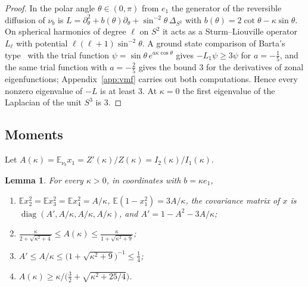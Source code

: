 \documentclass[aps,prd,twocolumn,superscriptaddress,nofootinbib,longbibliography,floatfix,amsmath,amssymb,10pt]{revtex4-2}
\newtheorem{lemma}[theorem]{Lemma}
\theoremstyle{definition}
\theoremstyle{remark}
\newcommand{\E}{\mathbb{E}}
\begin{document}
\begin{proof}
In the polar angle $\theta\in(0,\pi)$ from $e_1$ the generator of the
reversible diffusion of $\nu_b$ is $L=\partial_\theta^2+b(\theta)
\partial_\theta+\sin^{-2}\theta\,\Delta_{S^2}$ with $b(\theta)=2\cot\theta-
\kappa\sin\theta$. On spherical harmonics of degree $\ell$ on $S^2$ it acts as
a Sturm--Liouville operator $L_\ell$ with potential
$\ell(\ell+1)\sin^{-2}\theta$. A ground state comparison of Barta's
type~\cite{Bar37} with the trial function $\psi=\sin\theta\,
e^{a\kappa\cos\theta}$ gives $-L_1\psi\ge3\psi$ for $a=-\frac15$, and the same
trial function with $a=-\frac25$ gives the bound $3$ for the derivatives of
zonal eigenfunctions; Appendix~\ref{app:vmf} carries out both computations.
Hence every nonzero eigenvalue of $-L$ is at least $3$. At $\kappa=0$ the
first eigenvalue of the Laplacian of the unit $S^3$ is $3$.
\end{proof}

\subsection{Moments}

Let $A(\kappa)=\E_{\nu_b}x_1=Z'(\kappa)/Z(\kappa)=I_2(\kappa)/I_1(\kappa)$.

\begin{lemma}\label{lem:moments}
For every $\kappa>0$, in coordinates with $b=\kappa e_1$,
\begin{enumerate}[label=\textup{(\roman*)},leftmargin=*]
\item $\E x_2^2=\E x_3^2=\E x_4^2=A/\kappa$, $\E(1-x_1^2)=3A/\kappa$, the
covariance matrix of $x$ is $\operatorname{diag}(A',A/\kappa,A/\kappa,
A/\kappa)$, and $A'=1-A^2-3A/\kappa$;
\item $\displaystyle\frac{\kappa}{2+\sqrt{\kappa^2+4}}\le
A(\kappa)\le\frac{\kappa}{1+\sqrt{\kappa^2+9}}$;
\item $A'\le A/\kappa\le\bigl(1+\sqrt{\kappa^2+9}\bigr)^{-1}\le\frac14$;
\item $A(\kappa)\ge\kappa\big/\bigl(\frac32+\sqrt{\kappa^2+25/4}\bigr)$.
\end{enumerate}
\end{lemma}
\end{document}
